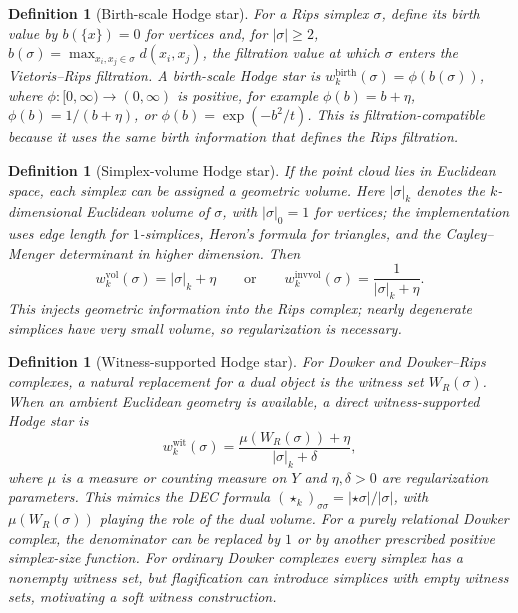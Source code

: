 \documentclass[11pt]{amsart}
\theoremstyle{plain}
\newtheorem{definition}[theorem]{Definition}
\begin{document}
\begin{definition}[Birth-scale Hodge star]
For a Rips simplex $\sigma$, define its birth value by
$b(\{x\})=0$ for vertices and, for $|\sigma|\geq2$,
$b(\sigma)=\max_{x_i,x_j\in\sigma} d(x_i,x_j)$, the filtration value at which $\sigma$ enters the
Vietoris--Rips filtration. A birth-scale Hodge star is
$w_k^{\mathrm{birth}}(\sigma)=\phi(b(\sigma))$, where $\phi:[0,\infty)\to(0,\infty)$ is positive,
for example $\phi(b)=b+\eta$, $\phi(b)=1/(b+\eta)$, or
$\phi(b)=\exp(-b^2/t)$. This is filtration-compatible because it uses the same birth information
that defines the Rips filtration.
\end{definition}

\begin{definition}[Simplex-volume Hodge star]
If the point cloud lies in Euclidean space, each simplex can be assigned a geometric volume. Here
$|\sigma|_k$ denotes the $k$-dimensional Euclidean volume of $\sigma$, with $|\sigma|_0=1$ for
vertices; the implementation uses edge length for $1$-simplices, Heron's formula for triangles, and
the Cayley--Menger determinant in higher dimension. Then
\[
w_k^{\mathrm{vol}}(\sigma)
=
|\sigma|_k+\eta
\qquad\text{or}\qquad
w_k^{\mathrm{invvol}}(\sigma)
=
\frac{1}{|\sigma|_k+\eta}.
\]
This injects geometric information into the Rips complex; nearly degenerate simplices have very
small volume, so regularization is necessary.
\end{definition}

\begin{definition}[Witness-supported Hodge star]
For Dowker and Dowker--Rips complexes, a natural replacement for a dual object is the witness set
$W_R(\sigma)$. When an ambient Euclidean geometry is available, a direct witness-supported Hodge
star is
\[
w_k^{\mathrm{wit}}(\sigma)
=
\frac{\mu(W_R(\sigma))+\eta}{|\sigma|_k+\delta},
\]
where $\mu$ is a measure or counting measure on $Y$ and $\eta,\delta>0$ are regularization
parameters. This mimics the DEC formula $(\star_k)_{\sigma\sigma}=|\star\sigma|/|\sigma|$, with
$\mu(W_R(\sigma))$ playing the role of the dual volume. For a purely relational Dowker complex, the
denominator can be replaced by $1$ or by another prescribed positive simplex-size function. For
ordinary Dowker complexes every simplex has a nonempty witness set, but flagification can introduce
simplices with empty witness sets, motivating a soft witness construction.
\end{definition}
\end{document}
